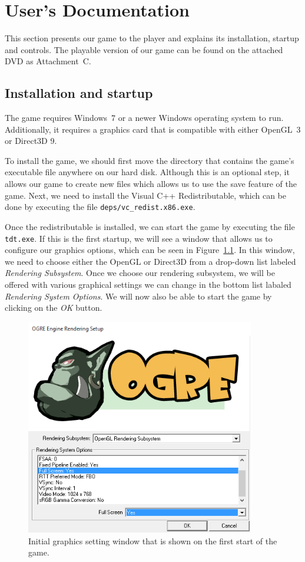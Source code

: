 \chapter{User's Documentation}

This section presents our game to the player and explains its installation, startup and controls. The playable version of our game
can be found on the attached DVD as Attachment~C.

\section{Installation and startup}

The game requires Windows~7 or a newer Windows operating system to run. Additionally, it requires a graphics card that is compatible
with either OpenGL~3 or Direct3D 9.

To install the game, we should first move the directory that contains the game's executable file anywhere on our hard disk. Although this is
an optional step, it allows our game to create new files which allows us to use the save feature of the game. Next, we need to install
the Visual C++ Redistributable, which can be done by executing the file \texttt{deps/vc\_redist.x86.exe}.

Once the redistributable is installed, we can start the game by executing the file \texttt{tdt.exe}. If this is the first startup, we will
see a window that allows us to configure our graphics options, which can be seen in Figure~\ref{ogre-config}. In this window, we need to
choose either the OpenGL or Direct3D from a drop-down list labeled \emph{Rendering Subsystem}. Once we choose our rendering subsystem, we
will be offered with various graphical settings we can change in the bottom list labaled \emph{Rendering System Options}. We will now also
be able to start the game by clicking on the \emph{OK} button.

\begin{figure}[H]
    \centering
    \includegraphics[width=10cm]{../img/ogre-cfg.png}
    \caption{Initial graphics setting window that is shown on the first start of the game.}
    \label{ogre-config}
\end{figure}

